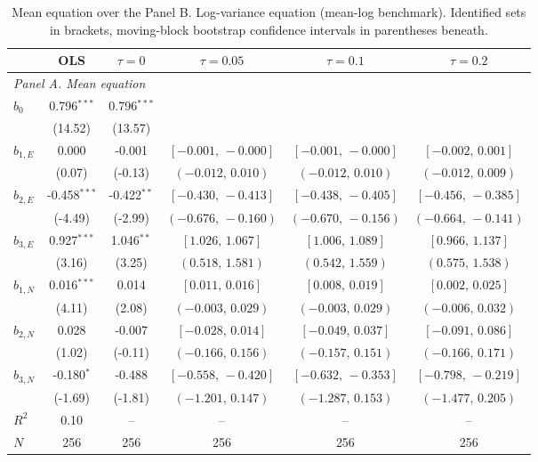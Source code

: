 \begin{table}[!htbp]
\centering
\begin{threeparttable}
\caption{Mean equation over the Panel B. Log-variance equation (mean-log benchmark). Identified sets in brackets, moving-block bootstrap confidence intervals in parentheses beneath.}
\label{tab:log_var_eq_panel_logols}
\scriptsize\setlength{\tabcolsep}{3pt}
\begin{tabular}{lccccc}
\toprule
 & OLS & $\tau{=}0$ & $\tau{=}0.05$ & $\tau{=}0.1$ & $\tau{=}0.2$ \\
\midrule
\multicolumn{6}{l}{\textit{Panel A. Mean equation}} \\
\midrule
$b_0$ & 0.796$^{***}$ & 0.796$^{***}$ &  &  &  \\
 & (14.52) & (13.57) &  &  &  \\
$b_{1,E}$ & 0.000 & -0.001 & $[-0.001,\,-0.000]$ & $[-0.001,\,-0.000]$ & $[-0.002,\,0.001]$ \\
 & (0.07) & (-0.13) & $(-0.012,\,0.010)$ & $(-0.012,\,0.010)$ & $(-0.012,\,0.009)$ \\
$b_{2,E}$ & -0.458$^{***}$ & -0.422$^{**}$ & $[-0.430,\,-0.413]$ & $[-0.438,\,-0.405]$ & $[-0.456,\,-0.385]$ \\
 & (-4.49) & (-2.99) & $(-0.676,\,-0.160)$ & $(-0.670,\,-0.156)$ & $(-0.664,\,-0.141)$ \\
$b_{3,E}$ & 0.927$^{***}$ & 1.046$^{**}$ & $[1.026,\,1.067]$ & $[1.006,\,1.089]$ & $[0.966,\,1.137]$ \\
 & (3.16) & (3.25) & $(0.518,\,1.581)$ & $(0.542,\,1.559)$ & $(0.575,\,1.538)$ \\
\midrule
$b_{1,N}$ & 0.016$^{***}$ & 0.014 & $[0.011,\,0.016]$ & $[0.008,\,0.019]$ & $[0.002,\,0.025]$ \\
 & (4.11) & (2.08) & $(-0.003,\,0.029)$ & $(-0.003,\,0.029)$ & $(-0.006,\,0.032)$ \\
$b_{2,N}$ & 0.028 & -0.007 & $[-0.028,\,0.014]$ & $[-0.049,\,0.037]$ & $[-0.091,\,0.086]$ \\
 & (1.02) & (-0.11) & $(-0.166,\,0.156)$ & $(-0.157,\,0.151)$ & $(-0.166,\,0.171)$ \\
$b_{3,N}$ & -0.180$^{*}$ & -0.488 & $[-0.558,\,-0.420]$ & $[-0.632,\,-0.353]$ & $[-0.798,\,-0.219]$ \\
 & (-1.69) & (-1.81) & $(-1.201,\,0.147)$ & $(-1.287,\,0.153)$ & $(-1.477,\,0.205)$ \\
\midrule
$R^2$ & 0.10 & -- & -- & -- & -- \\
$N$ & 256 & 256 & 256 & 256 & 256 \\

\end{tabular}
\end{threeparttable}
\end{table}
